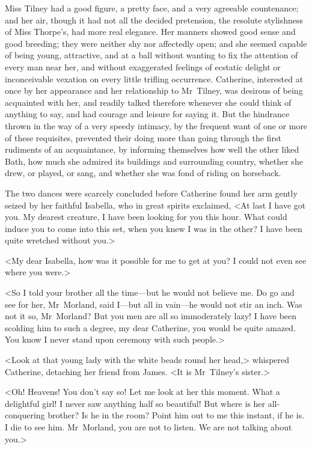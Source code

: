  Miss Tilney had a good figure, a pretty face, and a very agreeable countenance; and her air, though it had not all the decided pretension, the resolute stylishness of Miss Thorpe's, had more real elegance. Her manners showed good sense and good breeding; they were neither shy nor affectedly open; and she seemed capable of being young, attractive, and at a ball without wanting to fix the attention of every man near her, and without exaggerated feelings of ecstatic delight or inconceivable vexation on every little trifling occurrence. Catherine, interested at once by her appearance and her relationship to Mr~Tilney, was desirous of being acquainted with her, and readily talked therefore whenever she could think of anything to say, and had courage and leisure for saying it. But the hindrance thrown in the way of a very speedy intimacy, by the frequent want of one or more of these requisites, prevented their doing more than going through the first rudiments of an acquaintance, by informing themselves how well the other liked Bath, how much she admired its buildings and surrounding country, whether she drew, or played, or sang, and whether she was fond of riding on horseback. 

 The two dances were scarcely concluded before Catherine found her arm gently seized by her faithful Isabella, who in great spirits exclaimed, <At last I have got you. My dearest creature, I have been looking for you this hour. What could induce you to come into this set, when you knew I was in the other? I have been quite wretched without you.> 

 <My dear Isabella, how was it possible for me to get at you? I could not even see where you were.> 

 <So I told your brother all the time—but he would not believe me. Do go and see for her, Mr~Morland, said I—but all in vain—he would not stir an inch. Was not it so, Mr~Morland? But you men are all so immoderately lazy! I have been scolding him to such a degree, my dear Catherine, you would be quite amazed. You know I never stand upon ceremony with such people.> 

 <Look at that young lady with the white beads round her head,> whispered Catherine, detaching her friend from James. <It is Mr~Tilney's sister.> 

 <Oh! Heavens! You don't say so! Let me look at her this moment. What a delightful girl! I never saw anything half so beautiful! But where is her all-conquering brother? Is he in the room? Point him out to me this instant, if he is. I die to see him. Mr~Morland, you are not to listen. We are not talking about you.> 


